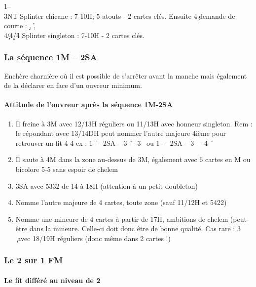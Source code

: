 \documentclass[a4paper]{article}
\begin{document}
\begin{bidtable}
1\s--\\
3NT \> Splinter chicane : 7-10H; 5 atouts - 2 cartes clés. Ensuite 4\c\ demande de courte : \d , \h , \c \\
4\c/4\d/4\h \> Splinter singleton : 7-10H - 2 cartes clés.
\end{bidtable}

\subsubsection{La séquence 1M – 2SA}

Enchère charnière où il est possible de s’arrêter avant la manche mais également de la déclarer en 
face d’un ouvreur minimum.

\paragraph{Attitude de l’ouvreur après la séquence 1M-2SA}

\begin{enumerate}
\item Il freine à 3M avec 12/13H réguliers ou 11/13H avec honneur singleton.
Rem : le répondant avec 13/14DH peut nommer l’autre majeure 4ième pour retrouver un fit 4-4
 ex : 1 \h\ - 2SA – 3 \h\ - 3 \s\ ou 1 \s\ - 2SA – 3 \s\ - 4 \h\ 

\item Il saute à 4M dans la zone au-dessus de 3M, également avec 6 cartes en M ou bicolore 5-5 sans 
espoir de chelem

\item 3SA avec 5332 de 14 à 18H (attention à un petit doubleton) 

\item Nomme l’autre majeure de 4 cartes, toute zone (sauf 11/12H et 5422)

\item Nomme une mineure de 4 cartes à partir de 17H, ambitions de chelem (peut-être dans la 
mineure. Celle-ci doit donc être de bonne qualité.
Cas rare : 3 \c\ avec 18/19H réguliers (donc même dans 2 cartes !)

\end{enumerate}

\subsubsection{Le 2 sur 1 FM}

\paragraph{Le fit différé au niveau de 2}
\end{document}
